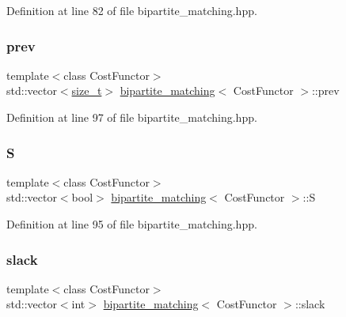 Definition at line 82 of file bipartite\+\_\+matching.\+hpp.

\mbox{\label{classbipartite__matching_a2b0418fb8023abdc337047b4cc6b5f4e}} 
\subsubsection{\texorpdfstring{prev}{prev}}
{\footnotesize\ttfamily template$<$class Cost\+Functor$>$ \\
std\+::vector$<$\hyperlink{tutorial__fpt__2017_2intro_2sixth_2test_8c_a7c94ea6f8948649f8d181ae55911eeaf}{size\+\_\+t}$>$ \hyperlink{classbipartite__matching}{bipartite\+\_\+matching}$<$ Cost\+Functor $>$\+::prev\hspace{0.3cm}{\ttfamily [private]}}



Definition at line 97 of file bipartite\+\_\+matching.\+hpp.

\mbox{\label{classbipartite__matching_a7e0563ba0994677f6dd9d98442c36ef2}} 
\subsubsection{\texorpdfstring{S}{S}}
{\footnotesize\ttfamily template$<$class Cost\+Functor$>$ \\
std\+::vector$<$bool$>$ \hyperlink{classbipartite__matching}{bipartite\+\_\+matching}$<$ Cost\+Functor $>$\+::S\hspace{0.3cm}{\ttfamily [private]}}



Definition at line 95 of file bipartite\+\_\+matching.\+hpp.

\mbox{\label{classbipartite__matching_aff5c655d394bc2f684d0c16b79da5241}} 
\subsubsection{\texorpdfstring{slack}{slack}}
{\footnotesize\ttfamily template$<$class Cost\+Functor$>$ \\
std\+::vector$<$int$>$ \hyperlink{classbipartite__matching}{bipartite\+\_\+matching}$<$ Cost\+Functor $>$\+::slack\hspace{0.3cm}{\ttfamily [private]}}



